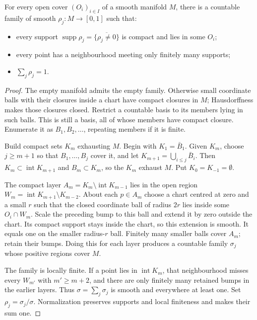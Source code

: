 \begin{theorem}\label{thm:partition}
For every open cover $(O_i)_{i\in I}$ of a smooth manifold $M$, there is a countable family of smooth $\rho_j:M\to[0,1]$ such that:
\begin{itemize}
\item every support $\operatorname{supp}\rho_j=\overline{\{\rho_j\ne0\}}$ is compact and lies in some $O_i$;
\item every point has a neighbourhood meeting only finitely many supports;
\item $\sum_j\rho_j=1$.
\end{itemize}
\end{theorem}
\begin{proof}
The empty manifold admits the empty family. Otherwise small coordinate balls with their closures inside a chart have compact closures in $M$; Hausdorffness makes those closures closed. Restrict a countable basis to its members lying in such balls. This is still a basis, all of whose members have compact closure. Enumerate it as $B_1,B_2,\ldots$, repeating members if it is finite.

Build compact sets $K_m$ exhausting $M$. Begin with $K_1=\bar B_1$. Given $K_m$, choose $j\ge m+1$ so that $B_1,\ldots,B_j$ cover it, and let $K_{m+1}=\bigcup_{i\le j}\bar B_i$. Then $K_m\subset\operatorname{int}K_{m+1}$ and $B_m\subset K_m$, so the $K_m$ exhaust $M$. Put $K_0=K_{-1}=\emptyset$.

The compact layer $A_m=K_m\setminus\operatorname{int}K_{m-1}$ lies in the open region $W_m=\operatorname{int}K_{m+1}\setminus K_{m-2}$. About each $p\in A_m$ choose a chart centred at zero and a small $r$ such that the closed coordinate ball of radius $2r$ lies inside some $O_i\cap W_m$. Scale the preceding bump to this ball and extend it by zero outside the chart. Its compact support stays inside the chart, so this extension is smooth. It equals one on the smaller radius-$r$ ball. Finitely many smaller balls cover $A_m$; retain their bumps. Doing this for each layer produces a countable family $\sigma_j$ whose positive regions cover $M$.

The family is locally finite. If a point lies in $\operatorname{int}K_m$, that neighbourhood misses every $W_{m'}$ with $m'\ge m+2$, and there are only finitely many retained bumps in the earlier layers. Thus $\sigma=\sum_j\sigma_j$ is smooth and everywhere at least one. Set $\rho_j=\sigma_j/\sigma$. Normalization preserves supports and local finiteness and makes their sum one.
\end{proof}

